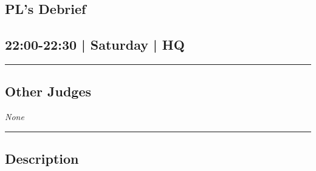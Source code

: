 \documentclass[10pt, A5]{article}
\begin{document}
		\begin{framed}
			\begin{minipage}{\textwidth}

			\setcounter{section}{84}
							\section{PL's Debrief}
						
			\subsection*{22:00-22:30 | Saturday | HQ}

			\vspace{0.25cm}
			\hrule
			\vspace{0.25cm}


			\subsection*{Other Judges}
						\textit{None}

					\vspace{0.25cm}
			\hrule
			\vspace{0.25cm}

			\begin{minipage}{\textwidth}
			\subsection*{\faListAlt \: Description}
			
			\end{minipage}


	\end{minipage}
	\end{framed}

	
\end{document}
